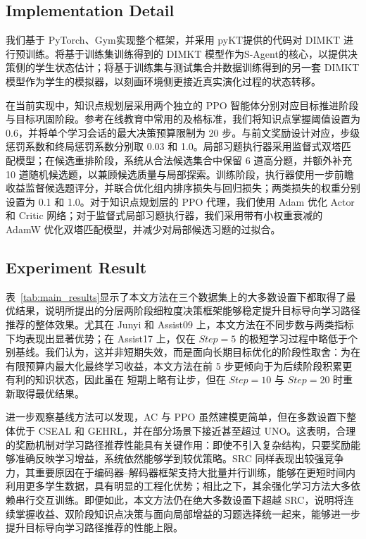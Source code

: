 \documentclass[11pt,a4paper]{article}
\begin{document}
\subsection{Implementation Detail}
我们基于 PyTorch\cite{paszke2019pytorch}、Gym\cite{brockman2016openai}实现整个框架，并采用 pyKT提供的代码对 DIMKT 进行预训练。将基于训练集训练得到的 DIMKT 模型作为S-Agent的核心，以提供决策侧的学生状态估计；将基于训练集与测试集合并数据训练得到的另一套 DIMKT 模型作为学生的模拟器，以刻画环境侧更接近真实演化过程的状态转移。

在当前实现中，知识点规划层采用两个独立的 PPO 智能体分别对应目标推进阶段与目标巩固阶段。参考在线教育中常用的及格标准，我们将知识点掌握阈值设置为 0.6，并将单个学习会话的最大决策预算限制为 20 步。与前文奖励设计对应，步级惩罚系数和终局惩罚系数分别取 0.03 和 1.0。局部习题执行器采用监督式双塔匹配模型；在候选重排阶段，系统从合法候选集合中保留 6 道高分题，并额外补充 10 道随机候选题，以兼顾候选质量与局部探索。训练阶段，执行器使用一步前瞻收益监督候选题评分，并联合优化组内排序损失与回归损失；两类损失的权重分别设置为 0.1 和 1.0。对于知识点规划层的 PPO 代理，我们使用 Adam\cite{kingma2014adam} 优化 Actor 和 Critic 网络；对于监督式局部习题执行器，我们采用带有小权重衰减的 AdamW\cite{loshchilov2017decoupled} 优化双塔匹配模型，并减少对局部候选习题的过拟合。

\subsection{Experiment Result}
表~\ref{tab:main_results}显示了本文方法在三个数据集上的大多数设置下都取得了最优结果，说明所提出的分层两阶段细粒度决策框架能够稳定提升目标导向学习路径推荐的整体效果。尤其在 Junyi 和 Assist09 上，本文方法在不同步数与两类指标下均表现出显著优势；在 Assist17 上，仅在 $Step=5$ 的极短学习过程中略低于个别基线。我们认为，这并非短期失效，而是面向长期目标优化的阶段性取舍：为在有限预算内最大化最终学习收益，本文方法在前 5 步更倾向于为后续阶段积累更有利的知识状态，因此虽在
短期上略有让步，但在 $Step=10$ 与 $Step=20$ 时重新取得最优结果。

进一步观察基线方法可以发现，AC 与 PPO 虽然建模更简单，但在多数设置下整体优于 CSEAL 和 GEHRL，并在部分场景下接近甚至超过 UNO。这表明，合理的奖励机制对学习路径推荐性能具有关键作用：即使不引入复杂结构，只要奖励能够准确反映学习增益，系统依然能够学到较优策略。SRC 同样表现出较强竞争力，其重要原因在于编码器--解码器框架支持大批量并行训练，能够在更短时间内利用更多学生数据，具有明显的工程化优势；相比之下，其余强化学习方法大多依赖串行交互训练。即便如此，本文方法仍在绝大多数设置下超越 SRC，说明将连续掌握收益、双阶段知识点决策与面向局部增益的习题选择统一起来，能够进一步提升目标导向学习路径推荐的性能上限。
\end{document}
